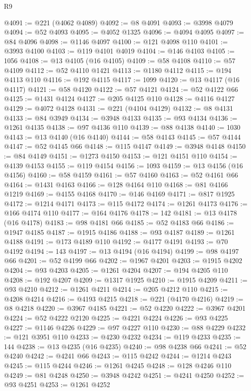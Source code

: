 \begin{lexlean}{R9}
\begin{coremodule}
@4091 := @221 (@4062 @4089)
@4092 := @8 @4091
@4093 := @3998 @4079
@4094 := @52 @4093
@4095 := @4052 @1325
@4096 := @4094 @4095
@4097 := @84 @4096
@4098 := @1146 @4097
@4100 := @121 @4098 @110
@4101 := @3993 @4100
@4103 := @119 @4101 @4019
@4104 := @146 @4103
@4105 := 1056
@4108 := @13 @4105 (@16 @4105)
@4109 := @58 @4108
@4110 := @57 @4109
@4112 := @52 @4110 @1421
@4113 := @1180 @4112
@4115 := @194 @4113 @110
@4116 := @192 @4115
@4117 := 1099
@4120 := @13 @4117 (@16 @4117)
@4121 := @58 @4120
@4122 := @57 @4121
@4124 := @52 @4122 @66
@4125 := @1431 @4124
@4127 := @205 @4125 @110
@4128 := @4116 @4127
@4129 := @4072 @4128
@4131 := @221 (@4104 @4129)
@4132 := @8 @4131
@4133 := @84 @3949
@4134 := @3948 @4133
@4135 := @93 @4134
@4136 := @1261 @4135
@4138 := @97 @4136 @110
@4139 := @88 @4138
@4140 := 1030
@4143 := @13 @4140 (@16 @4140)
@4144 := @58 @4143
@4145 := @57 @4144
@4147 := @52 @4145 @66
@4148 := @115 @4147
@4149 := @3948 @4148
@4150 := @84 @4149
@4151 := @1273 @4150
@4153 := @121 @4151 @110
@4154 := @4139 @4153
@4155 := @119 @4154
@4156 := 1093
@4159 := @13 @4156 (@16 @4156)
@4160 := @58 @4159
@4161 := @57 @4160
@4163 := @52 @4161 @66
@4164 := @1431 @4163
@4166 := @128 @4164 @110
@4168 := @81 @4166 @1219
@4169 := @4155 @4168
@4170 := @146 @4169
@4171 := @817 @1925
@4172 := @1214 @4171
@4173 := @115 @4172
@4174 := @1261 @4173
@4176 := @166 @4174 @110
@4177 := @164 @4176
@4178 := 142
@4181 := @13 @4178 (@16 @4178)
@4183 := @98 @4181 @66
@4185 := @52 @4183 @66
@4186 := @1947 @4185
@4187 := @1915 @4186
@4188 := @93 @4187
@4189 := @1261 @4188
@4191 := @173 @4189 @110
@4192 := @4177 @4191
@4193 := @70 @4192
@4194 := 143
@4197 := @13 @4194 (@16 @4194)
@4199 := @98 @4197 @66
@4201 := @52 @4199 @66
@4202 := @1967 @4201
@4203 := @1915 @4202
@4204 := @93 @4203
@4205 := @1261 @4204
@4207 := @194 @4205 @110
@4208 := @192 @4207
@4209 := @1317 @1925
@4210 := @1915 @4209
@4211 := @93 @4210
@4212 := @1261 @4211
@4214 := @205 @4212 @110
@4215 := @4208 @4214
@4216 := @4193 @4215
@4218 := @221 (@4170 @4216)
@4219 := @8 @4218
@4220 := @3967 @4185
@4221 := @52 @4220
@4222 := @3967 @4201
@4224 := @52 @4222 @2120
@4225 := @4221 @4224
@4226 := @93 @4225
@4227 := @1146 @4226
@4229 := @97 @4227 @110
@4230 := @88 @4229
@4232 := @121 @3951 @110
@4233 := @4230 @4232
@4234 := @119 @4233
@4235 := 144
@4238 := @13 @4235 (@16 @4235)
@4240 := @98 @4238 @66
@4241 := @52 @4240
@4242 := @4241 @66
@4243 := @115 @4242
@4244 := @1214 @4243
@4245 := @115 @4244
@4246 := @1261 @4245
@4248 := @128 @4246 @110
@4249 := @81 @4248
@4250 := @3948 @4242
@4251 := @4241 @4250
@4252 := @93 @4251
@4253 := @1261 @4252

\end{coremodule}
\end{lexlean}
